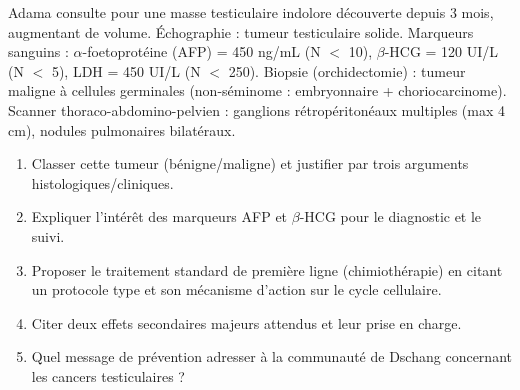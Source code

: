 \documentclass[11pt]{article}
\begin{document}
\begin{exercice}
Adama consulte pour une masse testiculaire indolore découverte depuis 3 mois, augmentant de volume. Échographie : tumeur testiculaire solide. Marqueurs sanguins : $\alpha$-foetoprotéine (AFP) = 450 ng/mL (N $<$ 10), $\beta$-HCG = 120 UI/L (N $<$ 5), LDH = 450 UI/L (N $<$ 250). Biopsie (orchidectomie) : tumeur maligne à cellules germinales (non-séminome : embryonnaire + choriocarcinome). Scanner thoraco-abdomino-pelvien : ganglions rétropéritonéaux multiples (max 4 cm), nodules pulmonaires bilatéraux.
\begin{enumerate}
    \item Classer cette tumeur (bénigne/maligne) et justifier par trois arguments histologiques/cliniques.
    \item Expliquer l'intérêt des marqueurs AFP et $\beta$-HCG pour le diagnostic et le suivi.
    \item Proposer le traitement standard de première ligne (chimiothérapie) en citant un protocole type et son mécanisme d'action sur le cycle cellulaire.
    \item Citer deux effets secondaires majeurs attendus et leur prise en charge.
    \item Quel message de prévention adresser à la communauté de Dschang concernant les cancers testiculaires ?
\end{enumerate}
\end{exercice}
\end{document}
